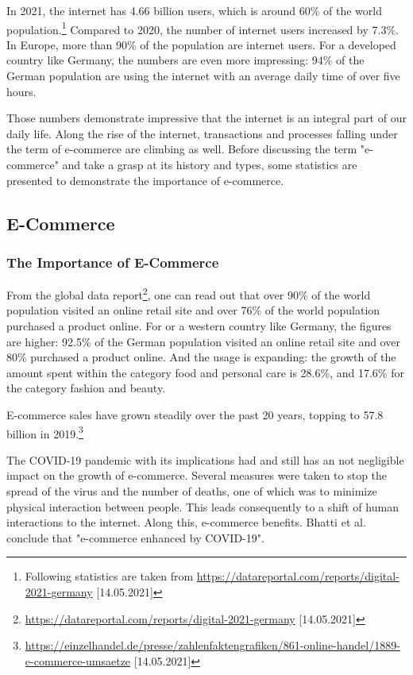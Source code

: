 
In 2021, the internet has 4.66 billion users, which is around 60\% of the world population.\footnote{Following statistics are taken from \url{https://datareportal.com/reports/digital-2021-germany} [14.05.2021]}
Compared to 2020, the number of internet users increased by 7.3\%.
In Europe, more than 90\% of the population are internet users.
For a developed country like Germany, the numbers are even more impressing:
94\% of the German population are using the internet with an average daily time of over five hours.

Those numbers demonstrate impressive that the internet is an integral part of our daily life.
Along the rise of the internet, transactions and processes falling under the term of e-commerce are climbing as well.
Before discussing the term "e-commerce" and take a grasp at its history and types, some statistics are presented to demonstrate the importance of e-commerce.


\subsection{E-Commerce}
\label{subsection:ecommerce_subchapter}

\subsubsection{The Importance of E-Commerce} %

From the global data report\footnote{\url{https://datareportal.com/reports/digital-2021-germany} [14.05.2021]}, one can read out that over 90\% of the world population visited an online retail site and over 76\% of the world population purchased a product online.
For or a western country like Germany, the figures are higher:
92.5\% of the German population visited an online retail site and over 80\% purchased a product online.
And the usage is expanding: the growth of the amount spent within the category food and personal care is 28.6\%, and 17.6\% for the category fashion and beauty.

E-commerce sales have grown steadily over the past 20 years, topping to 57.8 billion in 2019.\footnote{\url{https://einzelhandel.de/presse/zahlenfaktengrafiken/861-online-handel/1889-e-commerce-umsaetze} [14.05.2021]}


The COVID-19 pandemic with its implications had and still has an not negligible impact on the growth of e-commerce.
Several measures were taken to stop the spread of the virus and the number of deaths, one of which was to minimize physical interaction between people.
This leads consequently to a shift of human interactions to the internet.
Along this, e-commerce benefits.
Bhatti et al. \cite{2020Bhatti} conclude that "e-commerce enhanced by COVID-19".



